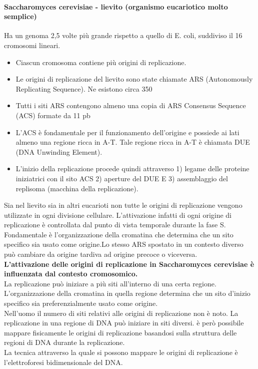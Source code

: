 \documentclass{article}
\begin{document}
\paragraph{Saccharomyces cerevisiae - lievito (organismo eucariotico molto semplice)}
Ha un genoma 2,5 volte più grande rispetto a quello di E. coli, suddiviso il 16 cromosomi lineari. 
\begin{itemize}
    \item Ciascun cromosoma contiene più origini di replicazione. 
    \item Le origini di replicazione del lievito sono state chiamate ARS (Autonomously Replicating Sequence). Ne esistono circa 350 
    \item Tutti i siti ARS contengono almeno una copia di ARS Consensus Sequence (ACS) formate da 11 pb 
    \item L'ACS è fondamentale per il funzionamento dell'origine e possiede ai lati almeno una regione ricca in A-T. Tale regione ricca in A-T è chiamata DUE (DNA Unwinding Element). 
    \item L'inizio della replicazione procede quindi attraverso 1) legame delle proteine iniziatrici con il sito ACS 2) aperture del DUE E 3) assemblaggio del replisoma (macchina della replicazione). 
\end{itemize}
Sia nel lievito sia in altri eucarioti non tutte le origini di replicazione
vengono utilizzate in ogni divisione cellulare. L'attivazione infatti di ogni origine di replicazione è controllata dal punto di vista temporale durante la fase S.\\
Fondamentale è l'organizzazione della cromatina che determina che un sito
specifico sia usato come origine.Lo stesso ARS spostato in un contesto diverso può cambiare da origine tardiva ad origine precoce o viceversa.\\
\textbf{L'attivazione delle origini di replicazione in Saccharomyces cerevisiae è influenzata dal contesto cromosomico.}\\
La replicazione può iniziare a più siti all'interno di una certa regione.\\ L'organizzazione della cromatina in quella regione determina che un sito d'inizio specifico sia preferenzialmente usato come origine.
\\[1ex]
Nell'uomo il numero di siti relativi alle origini di replicazione non è noto.
La replicazione in una regione di DNA può iniziare in siti diversi. è però possibile mappare fisicamente le origini di replicazione basandosi sulla
struttura delle regioni di DNA durante la replicazione.\\
La tecnica attraverso la quale si possono mappare le origini di replicazione è l'elettroforesi bidimensionale del DNA.
\end{document}
